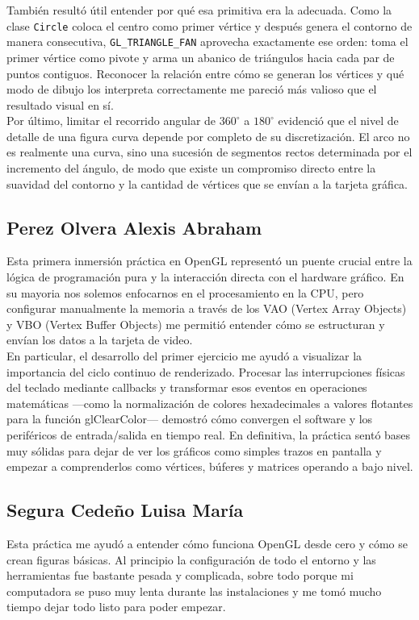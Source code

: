     También resultó útil entender por qué esa primitiva era la adecuada. Como la clase \texttt{Circle} coloca el centro como primer vértice y después genera el contorno de manera consecutiva, \texttt{GL\_TRIANGLE\_FAN} aprovecha exactamente ese orden: toma el primer vértice como pivote y arma un abanico de triángulos hacia cada par de puntos contiguos. Reconocer la relación entre cómo se generan los vértices y qué modo de dibujo los interpreta correctamente me pareció más valioso que el resultado visual en sí.\\

    Por último, limitar el recorrido angular de $360^\circ$ a $180^\circ$ evidenció que el nivel de detalle de una figura curva depende por completo de su discretización. El arco no es realmente una curva, sino una sucesión de segmentos rectos determinada por el incremento del ángulo, de modo que existe un compromiso directo entre la suavidad del contorno y la cantidad de vértices que se envían a la tarjeta gráfica.\\

    \subsection{Perez Olvera Alexis Abraham}
    Esta primera inmersión práctica en OpenGL representó un puente crucial entre la lógica de programación pura y la interacción directa con el hardware gráfico. En su mayoria nos solemos enfocarnos en el procesamiento en la CPU, pero configurar manualmente la memoria a través de los VAO (Vertex Array Objects) y VBO (Vertex Buffer Objects) me permitió entender cómo se estructuran y envían los datos a la tarjeta de video.\\

    En particular, el desarrollo del primer ejercicio me ayudó a visualizar la importancia del ciclo continuo de renderizado. Procesar las interrupciones físicas del teclado mediante callbacks y transformar esos eventos en operaciones matemáticas —como la normalización de colores hexadecimales a valores flotantes para la función glClearColor— demostró cómo convergen el software y los periféricos de entrada/salida en tiempo real. En definitiva, la práctica sentó bases muy sólidas para dejar de ver los gráficos como simples trazos en pantalla y empezar a comprenderlos como vértices, búferes y matrices operando a bajo nivel.\\

    \subsection{Segura Cedeño Luisa María}
     Esta práctica me ayudó a entender cómo funciona OpenGL desde cero y cómo se crean figuras básicas. Al principio la configuración de todo el entorno y las herramientas fue bastante pesada y complicada, sobre todo porque mi computadora se puso muy lenta durante las instalaciones y me tomó mucho tiempo dejar todo listo para poder empezar.
    
